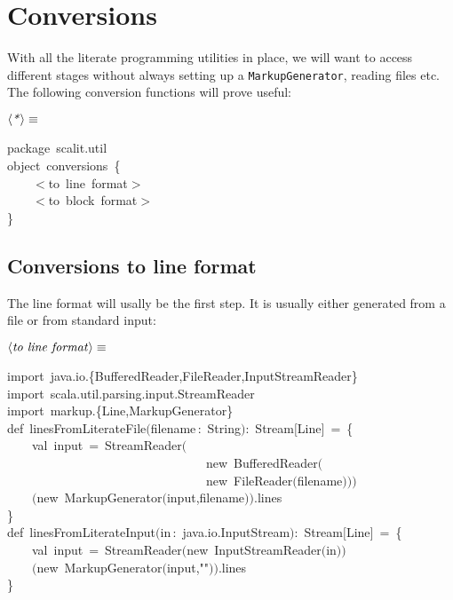 \documentclass[a4paper,12pt]{article}
\begin{document}
\section{Conversions}
With all the literate programming utilities in place, we will want to access
different stages without always setting up a \texttt{MarkupGenerator}, reading
files etc. The following conversion functions will prove useful:

$\left<\mbox{\emph{*}}\right>\equiv$
\begin{program}{\vem package}~scalit.util
\\[0.5em]{\vem object}~conversions~{\small\{}
\\~~~~$<$to~line~format$>$
\\[0.5em]~~~~$<$to~block~format$>$
\\{\small\}}
\\[0.5em]\end{program}



\subsection{Conversions to line format}
The line format will usally be the first step. It is usually either generated
from a file or from standard input:

$\left<\mbox{\emph{to line format}}\right>\equiv$
\begin{program}{\vem import}~java.io.{\small\{}BufferedReader,FileReader,InputStreamReader{\small\}}
\\{\vem import}~scala.util.parsing.input.StreamReader
\\[0.5em]{\vem import}~markup.{\small\{}Line,MarkupGenerator{\small\}}
\\[0.5em]{\vem def}~linesFromLiterateFile$($filename\,{\rm :}~String$)${\rm :}~Stream$[$Line$]$~=~{\small\{}
\\~~~~{\vem val}~input~=~StreamReader$($
\\~~~~~~~~~~~~~~~~~~~~~~~~~~~~~~~~{\vem new}~BufferedReader$($
\\~~~~~~~~~~~~~~~~~~~~~~~~~~~~~~~~{\vem new}~FileReader$($filename$)$$)$$)$
\\~~~~$(${\vem new}~MarkupGenerator$($input,filename$)$$)$.lines
\\{\small\}}
\\[0.5em]{\vem def}~linesFromLiterateInput$($in\,{\rm :}~java.io.InputStream$)${\rm :}~Stream$[$Line$]$~=~{\small\{}
\\~~~~{\vem val}~input~=~StreamReader$(${\vem new}~InputStreamReader$($in$)$$)$
\\~~~~$(${\vem new}~MarkupGenerator$($input,""$)$$)$.lines
\\{\small\}}
\\[0.5em]\end{program}
\end{document}
